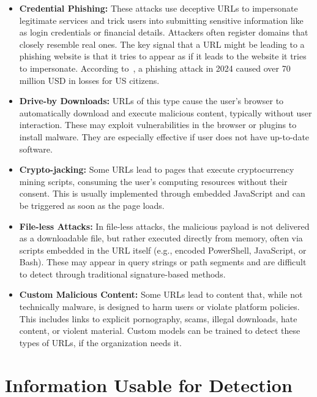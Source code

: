 \begin{itemize}
    \item \textbf{Credential Phishing:} These attacks use deceptive URLs to impersonate legitimate services and trick users into submitting sensitive information like as login credentials or financial details. Attackers often register domains that closely resemble real ones. The key signal that a URL might be leading to a phishing website is that it tries to appear as if it leads to the website it tries to impersonate. According to~\cite{fbi2024ic3report}, a phishing attack in 2024 caused over 70 million USD in losses for US citizens.

    \item \textbf{Drive-by Downloads:} URLs of this type cause the user's browser to automatically download and execute malicious content, typically without user interaction. These may exploit vulnerabilities in the browser or plugins to install malware. They are especially effective if user does not have up-to-date software.

    \item \textbf{Crypto-jacking:} Some URLs lead to pages that execute cryptocurrency mining scripts, consuming the user's computing resources without their consent. This is usually implemented through embedded JavaScript and can be triggered as soon as the page loads.

    \item \textbf{File-less Attacks:} In file-less attacks, the malicious payload is not delivered as a downloadable file, but rather executed directly from memory, often via scripts embedded in the URL itself (e.g., encoded PowerShell, JavaScript, or Bash). These may appear in query strings or path segments and are difficult to detect through traditional signature-based methods.

    \item \textbf{Custom Malicious Content:} Some URLs lead to content that, while not technically malware, is designed to harm users or violate platform policies. This includes links to explicit pornography, scams, illegal downloads, hate content, or violent material. Custom models can be trained to detect these types of URLs, if the organization needs it.
\end{itemize}

\section{Information Usable for Detection}


